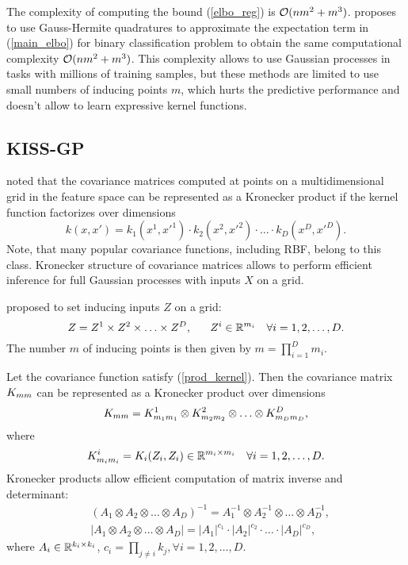   The complexity of computing the bound (\ref{elbo_reg}) is $\mathcal{O}(n m^2 + m^3)$.
  \citet{hensman2015} proposes to use Gauss-Hermite quadratures to approximate the
  expectation term in (\ref{main_elbo}) for binary classification problem to
  obtain the same computational complexity $\mathcal{O}(nm^2 + m^3)$. This complexity
  allows to use Gaussian processes in tasks with millions of training samples,
  but these methods are limited to use small numbers of inducing points $m$,
  which hurts the predictive performance and doesn't allow to learn expressive
  kernel functions.

\subsection{KISS-GP}
\label{kiss_gp}

  \citet{saatci2012} noted that the covariance matrices computed at points on a
  multidimensional grid in the feature space can be represented as a Kronecker
  product if the kernel function factorizes over dimensions
  \begin{equation}
  \label{prod_kernel}
    k(x, x') = k_1(x^1, x'^1)\cdot k_2(x^2, x'^2)\cdot \ldots\cdot k_D(x^D, x'^D).
  \end{equation}
  Note, that many popular covariance functions, including RBF, belong to this class.
  Kronecker structure of covariance matrices allows to perform efficient inference
  for full Gaussian processes with inputs $X$ on a grid.

  \citet{wilson2015} proposed to set inducing inputs $Z$ on a grid:
  \[
    Z = Z^1 \times Z^2 \times \ldots \times Z^D,~~~~~Z^i \in \mathbb{R}^{m_i}~~~\forall i = 1, 2, \ldots, D.
  \]
  The number $m$ of inducing points is then given by $m = \prod_{i=1}^D m_{i}$.

  Let the covariance function satisfy (\ref{prod_kernel}). Then the covariance
  matrix $K_{mm}$ can be represented as a Kronecker product over dimensions
  \[
    K_{mm} = K_{m_1 m_1}^1 \otimes K^2_{m_2 m_2} \otimes \ldots \otimes
    K^D_{m_D m_D},
  \]
  where
  \[
    K^i_{m_i m_i} = K_i(Z_i, Z_i) \in \mathbb{R}^{m_i \times m_i}~~~\forall i = 1, 2, \ldots, D.
  \]
  Kronecker products allow efficient computation of matrix inverse and determinant:
  \begin{align*}
    &(A_1 \otimes A_2 \otimes \ldots \otimes A_D)^{-1} = A_1^{-1} \otimes A_2^{-1} \otimes \ldots \otimes A_D^{-1},\\
    &|A_1 \otimes A_2 \otimes \ldots \otimes A_D| = |A_1|^{c_1} \cdot |A_2|^{c_2} \cdot \ldots \cdot |A_D|^{c_D},
  \end{align*}
  where $A_i\in\mathbb{R}^{k_i \times k_i}$, $c_i = \prod_{j \ne i} k_j,\forall i = 1, 2, \ldots, D$.
  
